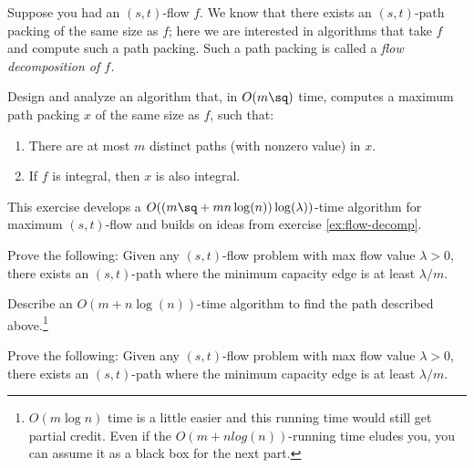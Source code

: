 \documentclass{article}
\begin{document}
\setcounter{section}{18}
\setcounter{exercise}{2}
\begin{exercise} \label{ex:flow-decomp}
  Suppose you had an \( (s, t) \)-flow \( f \).
  We know that there exists an \( (s,t) \)-path packing of the same size as \( f \); here we are interested in algorithms that take \( f \) and compute such a path packing.
  Such a path packing is called a \it{flow decomposition} of \( f \).

  Design and analyze an algorithm that, in \( O(m\sq) \) time, computes a maximum path packing \( x \) of the same size as \( f \), such that:
  \begin{enumerate}
    \item There are at most \( m \) distinct paths (with nonzero value) in \( x \).
    \item If \( f \) is integral, then \( x \) is also integral.
  \end{enumerate}
\end{exercise}

\begin{solution}

\end{solution}
\pagebreak

 This exercise develops a \( O((m\sq + mn\log(n))\log(\lambda)) \)-time algorithm for maximum \( (s,t) \)-flow and builds on ideas from exercise \ref{ex:flow-decomp}.

\begin{subexercise}
  Prove the following: Given any \( (s, t) \)-flow problem with max flow value \( \lambda > 0 \), there exists an \( (s, t) \)-path where the minimum capacity edge is at least \( \lambda/m \).
\end{subexercise}

\begin{solution}

\end{solution}
\pagebreak

\begin{subexercise}
  Describe an \( O(m+n\log(n)) \)-time algorithm to find the path described above.\footnote[4]{\( O(m\log n) \) time is a little easier and this running time would still get partial credit.
    Even if the \( O(m + n log(n)) \)-running time eludes you, you can assume it as a black box for the next part.}
\end{subexercise}

\begin{solution}

\end{solution}
\pagebreak

\begin{subexercise}
  Prove the following: Given any \( (s, t) \)-flow problem with max flow value \( \lambda > 0 \), there exists an \( (s, t) \)-path where the minimum capacity edge is at least \( \lambda/m \).
\end{subexercise}

\begin{solution}

\end{solution}
\pagebreak
\end{document}
